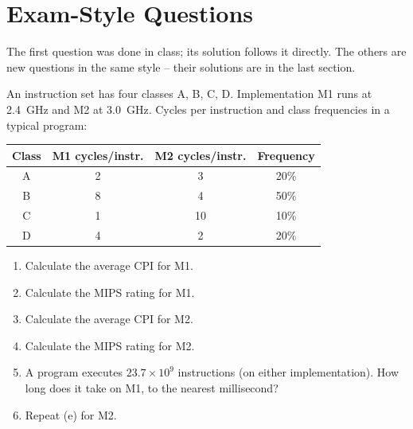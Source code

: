 \documentclass[11pt]{article}
\begin{document}
\section{Exam-Style Questions}

The first question was done in class; its solution follows it directly. The
others are new questions in the same style -- their solutions are in the last
section.

\begin{exercise}\label{x:class}
An instruction set has four classes A, B, C, D. Implementation M1 runs at
2.4~GHz and M2 at 3.0~GHz. Cycles per instruction and class frequencies in a
typical program:
\begin{center}
\begin{tabular}{@{}cccc@{}}
\toprule
Class & M1 cycles/instr. & M2 cycles/instr. & Frequency \\
\midrule
A & 2 & 3 & 20\% \\
B & 8 & 4 & 50\% \\
C & 1 & 10 & 10\% \\
D & 4 & 2 & 20\% \\
\bottomrule
\end{tabular}
\end{center}
\begin{enumerate}[label=(\alph*),leftmargin=*]
  \item Calculate the average CPI for M1.
  \item Calculate the MIPS rating for M1.
  \item Calculate the average CPI for M2.
  \item Calculate the MIPS rating for M2.
  \item A program executes $23.7\times10^9$ instructions (on either
  implementation). How long does it take on M1, to the nearest millisecond?
  \item Repeat (e) for M2.
\end{enumerate}
\end{exercise}
\end{document}
